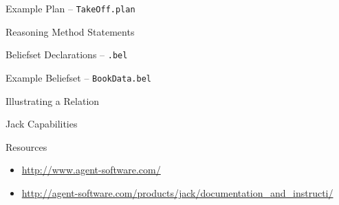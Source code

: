 \documentclass[aspectratio=1610,xcolor=dvipsnames,t]{beamer}
\begin{document}
\begin{frame}{Example Plan -- \texttt{TakeOff.plan}}
\end{frame}

\begin{frame}{Reasoning Method Statements} 
\end{frame} 

\begin{frame}{Beliefset Declarations -- \texttt{.bel}}
\end{frame} 

\begin{frame}{Example Beliefset -- \texttt{BookData.bel}}
\end{frame} 

\begin{frame}{Illustrating a Relation}
\end{frame}

\begin{frame}{Jack Capabilities}
\end{frame} 

\begin{frame}{Resources}
    \begin{itemize}
        \item \url{http://www.agent-software.com/}
        \item
            \url{http://agent-software.com/products/jack/documentation\_and\_instructi/}
    \end{itemize}
\end{frame} 
\end{document}
